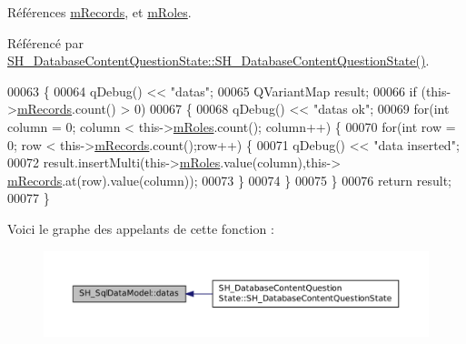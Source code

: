Références \hyperlink{classSH__SqlDataModel_aa58096989daac3cd3fdea5e6dd4f27ee}{m\-Records}, et \hyperlink{classSH__SqlDataModel_ad1e46c72a6aeb83e3e7bb0c3110d12a4}{m\-Roles}.



Référencé par \hyperlink{classSH__DatabaseContentQuestionState_ab26490ea519262a8f9ca72c000bf7313}{S\-H\-\_\-\-Database\-Content\-Question\-State\-::\-S\-H\-\_\-\-Database\-Content\-Question\-State()}.


\begin{DoxyCode}
00063 \{
00064     qDebug() << \textcolor{stringliteral}{"datas"};
00065     QVariantMap result;
00066     \textcolor{keywordflow}{if} (this->\hyperlink{classSH__SqlDataModel_aa58096989daac3cd3fdea5e6dd4f27ee}{mRecords}.count() > 0)
00067     \{
00068         qDebug() << \textcolor{stringliteral}{"datas ok"};
00069         \textcolor{keywordflow}{for}(\textcolor{keywordtype}{int} column = 0; column < this->\hyperlink{classSH__SqlDataModel_ad1e46c72a6aeb83e3e7bb0c3110d12a4}{mRoles}.count(); column++) \{
00070             \textcolor{keywordflow}{for}(\textcolor{keywordtype}{int} row = 0; row < this->\hyperlink{classSH__SqlDataModel_aa58096989daac3cd3fdea5e6dd4f27ee}{mRecords}.count();row++) \{
00071                 qDebug() << \textcolor{stringliteral}{"data inserted"};
00072                 result.insertMulti(this->\hyperlink{classSH__SqlDataModel_ad1e46c72a6aeb83e3e7bb0c3110d12a4}{mRoles}.value(column),this->
      \hyperlink{classSH__SqlDataModel_aa58096989daac3cd3fdea5e6dd4f27ee}{mRecords}.at(row).value(column));
00073             \}
00074         \}
00075     \}
00076     \textcolor{keywordflow}{return} result;
00077 \}
\end{DoxyCode}


Voici le graphe des appelants de cette fonction \-:\nopagebreak
\begin{figure}[H]
\begin{center}
\leavevmode
\includegraphics[width=350pt]{classSH__SqlDataModel_a6d91d42cfaf86d1fbbaeeb7a32efc26b_icgraph}
\end{center}
\end{figure}


